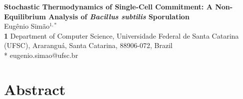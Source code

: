 \documentclass[11pt,a4paper]{article}
\begin{document}
\doublespacing
\linenumbers
\vspace*{0.2in}

\begin{flushleft}
{\Large
\textbf{Stochastic Thermodynamics of Single-Cell Commitment:
A Non-Equilibrium Analysis of \textit{Bacillus subtilis} Sporulation}
}
\newline
\\
Eug\^{e}nio Sim\~{a}o$^{1,*}$
\\
\bigskip
\textbf{1} Department of Computer Science, Universidade Federal de Santa
Catarina (UFSC), Ararangu\'a, Santa Catarina, 88906-072, Brazil
\\
\bigskip
* eugenio.simao@ufsc.br
\end{flushleft}

\section*{Abstract}
\end{document}
